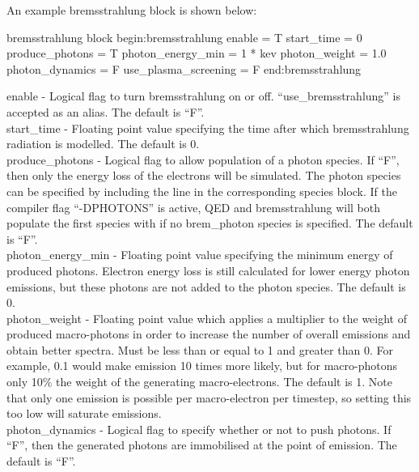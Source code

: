 An example bremsstrahlung block is shown below:

\begin{lboxverbatim}{bremsstrahlung block}
begin:bremsstrahlung
   enable = T
   start_time = 0
   produce_photons = T
   photon_energy_min = 1 * kev
   photon_weight = 1.0
   photon_dynamics = F
   use_plasma_screening = F
end:bremsstrahlung
\end{lboxverbatim}

{\emphtext enable} - Logical flag to turn bremsstrahlung on or off.
  ``use\_bremsstrahlung'' is accepted as an alias. The default is ``F''.\\

{\emphtext start\_time} - Floating point value specifying the time after
  which bremsstrahlung radiation is modelled. The default is 0.\\

{\emphtext produce\_photons} - Logical flag to allow population of a photon
  species. If ``F'', then only the energy loss of the electrons will be
  simulated. The photon species can be specified by including the line
   in the corresponding species block. If the
  compiler flag ``-DPHOTONS'' is active, QED and bremsstrahlung will both
  populate the first species with  if no
  brem\_photon species is specified. The default is ``F''.\\

{\emphtext photon\_energy\_min} - Floating point value specifying the minimum
  energy of produced photons. Electron energy loss is still calculated for
  lower energy photon emissions, but these photons are not added to the photon
  species. The default is 0.\\

{\emphtext photon\_weight} - Floating point value which applies a multiplier to
  the weight of produced macro-photons in order to increase the number
  of overall emissions and obtain better spectra. Must be less than or equal
  to 1 and greater than 0. For example, 0.1 would make emission 10 times more
  likely, but for macro-photons only 10\% the weight of the generating
  macro-electrons. The default is 1. Note that only one emission is possible
  per macro-electron per timestep, so setting this too low will saturate
  emissions.\\

{\emphtext photon\_dynamics} - Logical flag to specify whether or not to push
  photons. If ``F'', then the generated photons are immobilised at the point of
  emission. The default is ``F''.\\

